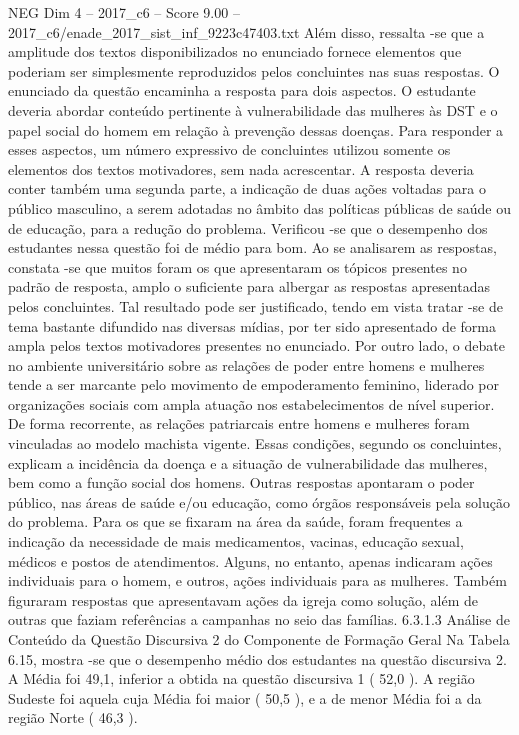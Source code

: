 \begin{textsample}{NEG Dim 4 – 2017\_c6 – Score 9.00 – 2017\_c6/enade\_2017\_sist\_inf\_9223c47403.txt}
Além disso, ressalta -se que a amplitude dos textos disponibilizados no enunciado fornece elementos que poderiam ser simplesmente reproduzidos pelos concluintes nas suas respostas.
O enunciado da questão encaminha a resposta para dois aspectos.
O estudante deveria abordar conteúdo pertinente à vulnerabilidade das mulheres às DST e o papel social do homem em relação à prevenção dessas doenças.
Para responder a esses aspectos, um número expressivo de concluintes utilizou somente os elementos dos textos motivadores, sem nada acrescentar.
A resposta deveria conter também uma segunda parte, a indicação de duas ações voltadas para o público masculino, a serem adotadas no âmbito das políticas públicas de saúde ou de educação, para a redução do problema.
Verificou -se que o desempenho dos estudantes nessa questão foi de médio para bom.
Ao se analisarem as respostas, constata -se que muitos foram os que apresentaram os tópicos presentes no padrão de resposta, amplo o suficiente para albergar as respostas apresentadas pelos concluintes.
Tal resultado pode ser justificado, tendo em vista tratar -se de tema bastante difundido nas diversas mídias, por ter sido apresentado de forma ampla pelos textos motivadores presentes no enunciado.
Por outro lado, o debate no ambiente universitário sobre as relações de poder entre homens e mulheres tende a ser marcante pelo movimento de empoderamento feminino, liderado por organizações sociais com ampla atuação nos estabelecimentos de nível superior.
De forma recorrente, as relações patriarcais entre homens e mulheres foram vinculadas ao modelo machista vigente.
Essas condições, segundo os concluintes, explicam a incidência da doença e a situação de vulnerabilidade das mulheres, bem como a função social dos homens.
Outras respostas apontaram o poder público, nas áreas de saúde e/ou educação, como órgãos responsáveis pela solução do problema.
Para os que se fixaram na área da saúde, foram frequentes a indicação da necessidade de mais medicamentos, vacinas, educação sexual, médicos e postos de atendimentos.
Alguns, no entanto, apenas indicaram ações individuais para o homem, e outros, ações individuais para as mulheres.
Também figuraram respostas que apresentavam ações da igreja como solução, além de outras que faziam referências a campanhas no seio das famílias. 6.3.1.3 Análise de Conteúdo da Questão Discursiva 2 do Componente de Formação Geral Na Tabela 6.15, mostra -se que o desempenho médio dos estudantes na questão discursiva 2.
A Média foi 49,1, inferior a obtida na questão discursiva 1 ( 52,0 ).
A região Sudeste foi aquela cuja Média foi maior ( 50,5 ), e a de menor Média foi a da região Norte ( 46,3 ).

\end{textsample}
